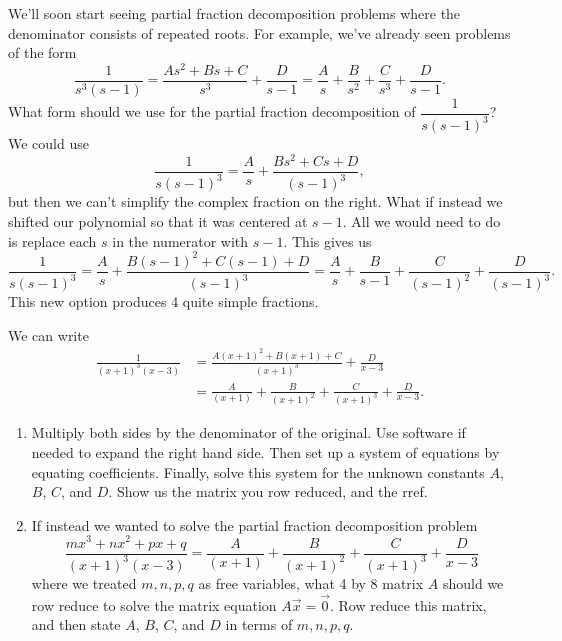  








 



We'll soon start seeing partial fraction decomposition problems where the denominator consists of repeated roots.  For example, we've already seen problems of the form 
$$\dfrac{1}{s^3(s-1)} 
= \dfrac{As^2+Bs+C}{s^3}+\dfrac{D}{s-1} 
= \frac{A}{s}+\frac{B}{s^2}+\frac{C}{s^3}+\frac{D}{s-1}.$$
What form should we use for the partial fraction decomposition of $\dfrac{1}{s(s-1)^3}$?  We could use
$$
\dfrac{1}{s(s-1)^3} 
= \dfrac{A}{s}+\dfrac{Bs^2+Cs+D}{(s-1)^3}, 
$$
but then we can't simplify the complex fraction on the right.  What if instead we shifted our polynomial so that it was centered at $s-1$.  All we would need to do is replace each $s$ in the numerator with $s-1$.  This gives us
$$
\dfrac{1}{s(s-1)^3} 
= \dfrac{A}{s}+\dfrac{B(s-1)^2+C(s-1)+D}{(s-1)^3} 
= \dfrac{A}{s}+\dfrac{B}{s-1}+\dfrac{C}{(s-1)^2}+\dfrac{D}{(s-1)^3}. 
$$
This new option produces 4 quite simple fractions.





\begin{problem}
We can write 
\begin{align*}
\frac{1}{(x+1)^3(x-3)}
&=\frac{A(x+1)^2+B(x+1)+C}{(x+1)^3}+\frac{D}{x-3} \\
&=
\frac{A}{(x+1)}
+\frac{B}{(x+1)^2}
+\frac{C}{(x+1)^3}
+\frac{D}{x-3} . 
\end{align*}
\begin{enumerate}
 \item 
Multiply both sides by the denominator of the original. 
Use software if needed to expand the right hand side. 
Then set up a system of equations by equating coefficients. 
Finally, solve this system for the unknown constants $A$, $B$, $C$, and $D$. Show us the matrix you row reduced, and the rref.
 \item 
If instead we wanted to solve the partial fraction decomposition problem
$$\frac{mx^3+nx^2+px+q}{(x+1)^3(x-3)} = 
\frac{A}{(x+1)}
+\frac{B}{(x+1)^2}
+\frac{C}{(x+1)^3}
+\frac{D}{x-3}$$
where we treated $m,n,p,q$ as free variables, what 4 by 8 matrix $A$ should we row reduce to solve the matrix equation $A\vec x = \vec 0$. Row reduce this matrix, and then state $A$, $B$, $C$, and $D$ in terms of $m,n,p,q$. 
\end{enumerate}

\end{problem}













